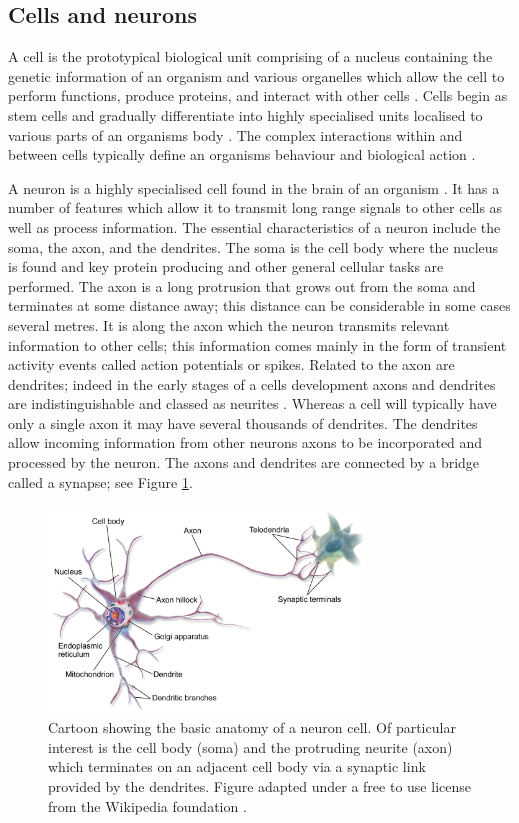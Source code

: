 \subsection{Cells and neurons}
A cell is the prototypical biological unit comprising of a nucleus containing the genetic information of an organism and various organelles which allow the cell to perform functions, produce proteins, and interact with other cells \cite{Alberts2002-rr}. Cells begin as stem cells and gradually differentiate into highly specialised units localised to various parts of an organisms body \cite{Alberts2002-rr}. The complex interactions within and between cells typically define an organisms behaviour and biological action \cite{Alberts2002-rr}.

A neuron is a highly specialised cell found in the brain of an organism \cite{Squire2012-ru}. It has a number of features which allow it to transmit long range signals to other cells as well as process information. The essential characteristics of a neuron include the soma, the axon, and the dendrites. The soma is the cell body where the nucleus is found and key protein producing and other general cellular tasks are performed. The axon is a long protrusion that grows out from the soma and terminates at some distance away; this distance can be considerable in some cases several metres. It is along the axon which the neuron transmits relevant information to other cells; this information comes mainly in the form of transient activity events called action potentials or spikes. Related to the axon are dendrites; indeed in the early stages of a cells development axons and dendrites are indistinguishable and classed as neurites \cite{Flynn2013-yn}. Whereas a cell will typically have only a single axon it may have several thousands of dendrites. The dendrites allow incoming information from other neurons axons to be incorporated and processed by the neuron. The axons and dendrites are connected by a bridge called a synapse; see Figure \ref{fig:neuronanatomy}.
\begin{figure}[h!]
	\centering
	\includegraphics[width = 0.75\textwidth]{images/introduction/neuron_anatomy}
	 \def\c{Cartoon showing the basic anatomy of a neuron cell. }
	
	\caption[\c]{\label{fig:neuronanatomy} \c Of particular interest is the cell body (soma) and the protruding neurite (axon) which terminates on an adjacent cell body via a synaptic link provided by the dendrites. Figure adapted under a free to use license from the Wikipedia foundation \cite{neuronimage}.} 
\end{figure}
